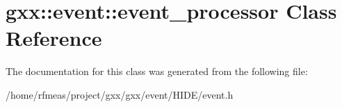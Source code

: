 \hypertarget{classgxx_1_1event_1_1event__processor}{}\section{gxx\+:\+:event\+:\+:event\+\_\+processor Class Reference}
\label{classgxx_1_1event_1_1event__processor}


The documentation for this class was generated from the following file\+:\begin{DoxyCompactItemize}
\item 
/home/rfmeas/project/gxx/gxx/event/\+H\+I\+D\+E/event.\+h\end{DoxyCompactItemize}
